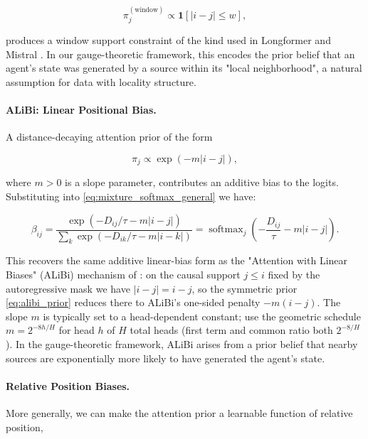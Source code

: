 \documentclass[twoside,11pt]{article}
\begin{document}
\begin{equation}
\pi_j^{(\text{window})} \propto \mathbf{1}[|i - j| \leq w],
\label{eq:window_prior}
\end{equation}

produces a window support constraint of the kind used in Longformer \citep{beltagy2020longformer} and Mistral \citep{jiang2023mistral}. In our gauge-theoretic framework, this encodes the prior belief that an agent's state was generated by a source within its "local neighborhood", a natural assumption for data with locality structure.

\paragraph{ALiBi: Linear Positional Bias.}

A distance-decaying attention prior of the form

\begin{equation}
\pi_j \propto \exp(-m|i - j|),
\label{eq:alibi_prior}
\end{equation}

where $m > 0$ is a slope parameter, contributes an additive bias to the logits. Substituting into \eqref{eq:mixture_softmax_general} we have:

\begin{equation}
\beta_{ij} = \frac{\exp(-D_{ij}/\tau - m|i-j|)}{\sum_k \exp(-D_{ik}/\tau - m|i-k|)} = \operatorname{softmax}_j \left(-\frac{D_{ij}}{\tau} - m|i - j|\right).
\label{eq:alibi_attention}
\end{equation}

This recovers the same additive linear-bias form as the "Attention with Linear Biases" (ALiBi) mechanism of \citet{press2022train}: on the causal support $j \leq i$ fixed by the autoregressive mask we have $|i-j| = i-j$, so the symmetric prior \eqref{eq:alibi_prior} reduces there to ALiBi's one-sided penalty $-m(i-j)$. The slope $m$ is typically set to a head-dependent constant; \citet{press2022train} use the geometric schedule $m = 2^{-8h/H}$ for head $h$ of $H$ total heads (first term and common ratio both $2^{-8/H}$). In the gauge-theoretic framework, ALiBi arises from a prior belief that nearby sources are exponentially more likely to have generated the agent's state.

\paragraph{Relative Position Biases.}
More generally, we can make the attention prior a learnable function of relative position,
\end{document}
